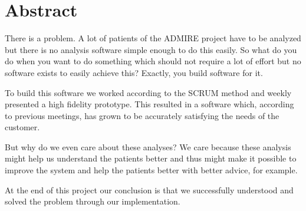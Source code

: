 \chapter*{Abstract}

There is a problem. A lot of patients of the ADMIRE project have to be analyzed but there is no analysis software simple enough to do this easily. So what do you do when you want to do something which should not require a lot of effort but no software exists to easily achieve this? Exactly, you build software for it.

To build this software we worked according to the SCRUM method and weekly presented a high fidelity prototype. This resulted in a software which, according to previous meetings, has grown to be accurately satisfying the needs of the customer. %

But why do we even care about these analyses? We care because these analysis might help us understand the patients better and thus might make it possible to improve the system and help the patients better with better advice, for example.

At the end of this project our conclusion is that we successfully understood and solved the problem through our implementation.

